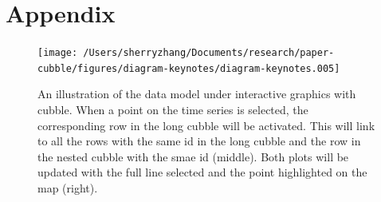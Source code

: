 \documentclass[
]{jss}
\begin{document}
\hypertarget{appendix}{%
\section{Appendix}\label{appendix}}

\begin{CodeChunk}
\begin{figure}

{\centering \texttt{[image: /Users/sherryzhang/Documents/research/paper-cubble/figures/diagram-keynotes/diagram-keynotes.005]} 

}

\caption[An illustration of the data model under interactive graphics with cubble]{An illustration of the data model under interactive graphics with cubble. When a point on the time series is selected, the corresponding row in the long cubble will be activated. This will link to all the rows with the same id in the long cubble and the row in the nested cubble with the smae id (middle). Both plots will be updated with the full line selected and the point highlighted on the map (right).}\label{fig:illu-interactive-2}
\end{figure}
\end{CodeChunk}

\newpage


\end{document}
